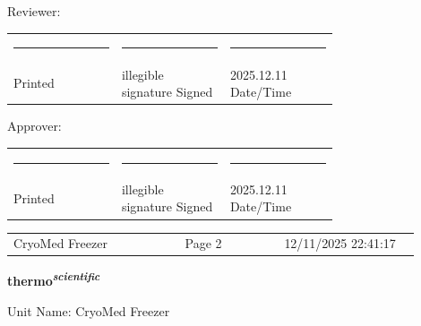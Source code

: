 \documentclass[UTF8,10pt,a4paper,fontset=fandol]{ctexart}
\newcommand{\fieldvalue}[1]{#1}
\newcommand{\handwritten}[1]{#1}
\begin{document}
\vspace{0.8em}

\noindent Reviewer:

\vspace{0.2em}
\begin{tabular}{p{0.24\linewidth} p{0.24\linewidth} p{0.24\linewidth}}
\rule{\linewidth}{0.4pt} &
\rule{\linewidth}{0.4pt} &
\rule{\linewidth}{0.4pt} \\[-0.1em]
Printed &
\fieldvalue{\handwritten{illegible signature}} Signed &
\fieldvalue{\handwritten{2025.12.11}} Date/Time
\end{tabular}

\vspace{0.8em}

\noindent Approver:

\vspace{0.2em}
\begin{tabular}{p{0.24\linewidth} p{0.24\linewidth} p{0.24\linewidth}}
\rule{\linewidth}{0.4pt} &
\rule{\linewidth}{0.4pt} &
\rule{\linewidth}{0.4pt} \\[-0.1em]
Printed &
\fieldvalue{\handwritten{illegible signature}} Signed &
\fieldvalue{\handwritten{2025.12.11}} Date/Time
\end{tabular}

\vfill

\noindent\scriptsize
\begin{tabular}{p{0.38\linewidth} p{0.22\linewidth} p{0.30\linewidth}}
CryoMed Freezer & Page 2 & 12/11/2025 22:41:17
\end{tabular}

\hfill\raisebox{0.2em}{\handwritten{0/10}}

\newpage

\begin{center}
\textbf{thermo\textsuperscript{\textit{scientific}}}
\end{center}

\noindent
Unit Name:
\fieldvalue{CryoMed Freezer}
\end{document}

